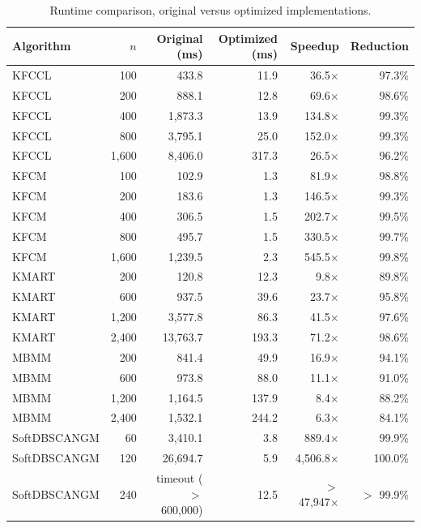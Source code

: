 \begin{table}[t]
\centering
\caption{Runtime comparison, original versus optimized implementations.}
\label{tab:runtime}
\begin{tabular}{lrrrrr}
\toprule
Algorithm & $n$ & Original (ms) & Optimized (ms) & Speedup & Reduction \\
\midrule
KFCCL & 100 & 433.8 & 11.9 & 36.5$\times$ & 97.3\% \\
KFCCL & 200 & 888.1 & 12.8 & 69.6$\times$ & 98.6\% \\
KFCCL & 400 & 1,873.3 & 13.9 & 134.8$\times$ & 99.3\% \\
KFCCL & 800 & 3,795.1 & 25.0 & 152.0$\times$ & 99.3\% \\
KFCCL & 1,600 & 8,406.0 & 317.3 & 26.5$\times$ & 96.2\% \\
KFCM & 100 & 102.9 & 1.3 & 81.9$\times$ & 98.8\% \\
KFCM & 200 & 183.6 & 1.3 & 146.5$\times$ & 99.3\% \\
KFCM & 400 & 306.5 & 1.5 & 202.7$\times$ & 99.5\% \\
KFCM & 800 & 495.7 & 1.5 & 330.5$\times$ & 99.7\% \\
KFCM & 1,600 & 1,239.5 & 2.3 & 545.5$\times$ & 99.8\% \\
KMART & 200 & 120.8 & 12.3 & 9.8$\times$ & 89.8\% \\
KMART & 600 & 937.5 & 39.6 & 23.7$\times$ & 95.8\% \\
KMART & 1,200 & 3,577.8 & 86.3 & 41.5$\times$ & 97.6\% \\
KMART & 2,400 & 13,763.7 & 193.3 & 71.2$\times$ & 98.6\% \\
MBMM & 200 & 841.4 & 49.9 & 16.9$\times$ & 94.1\% \\
MBMM & 600 & 973.8 & 88.0 & 11.1$\times$ & 91.0\% \\
MBMM & 1,200 & 1,164.5 & 137.9 & 8.4$\times$ & 88.2\% \\
MBMM & 2,400 & 1,532.1 & 244.2 & 6.3$\times$ & 84.1\% \\
SoftDBSCANGM & 60 & 3,410.1 & 3.8 & 889.4$\times$ & 99.9\% \\
SoftDBSCANGM & 120 & 26,694.7 & 5.9 & 4,506.8$\times$ & 100.0\% \\
SoftDBSCANGM & 240 & timeout ($>$ 600,000) & 12.5 & $>$ 47,947$\times$ & $>$ 99.9\% \\
\bottomrule
\end{tabular}
\end{table}
